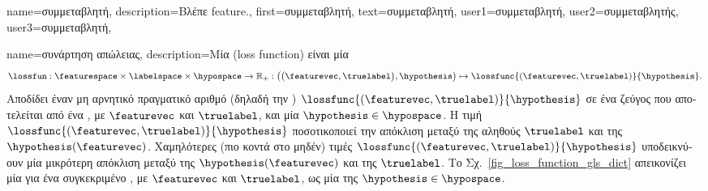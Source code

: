 {name={\foreignlanguage{greek}{συμμεταβλητή}},
	description={\foreignlanguage{greek}{Βλέπε} \gls{feature}.}, 
	first={\foreignlanguage{greek}{συμμεταβλητή}},
	text={\foreignlanguage{greek}{συμμεταβλητή}},
	user1={\foreignlanguage{greek}{συμμεταβλητή}}, %
	user2={\foreignlanguage{greek}{συμμεταβλητής}}, %
	user3={\foreignlanguage{greek}{συμμεταβλητή}}, %
}

{name={\foreignlanguage{greek}{συνάρτηση απώλειας}}, 
	description={\foreignlanguage{greek}{Μία}   
		(loss function) \foreignlanguage{greek}{είναι μία}  
		$$\lossfun: \featurespace \times \labelspace \times \hypospace \rightarrow \mathbb{R}_{+}: \big( \big(\featurevec,\truelabel\big),
		 \hypothesis\big) \mapsto  \lossfunc{(\featurevec,\truelabel)}{\hypothesis}.$$
		\foreignlanguage{greek}{Αποδίδει έναν μη αρνητικό πραγματικό αριθμό (δηλαδή την} )\linebreak 
		$\lossfunc{(\featurevec,\truelabel)}{\hypothesis}$ \foreignlanguage{greek}{σε ένα ζεύγος που αποτελείται από ένα} , 
		\foreignlanguage{greek}{με}  $\featurevec$ \foreignlanguage{greek}{και}  $\truelabel$, 
		\foreignlanguage{greek}{και μία}  $\hypothesis \in \hypospace$. \foreignlanguage{greek}{Η τιμή  
		$\lossfunc{(\featurevec,\truelabel)}{\hypothesis}$ ποσοτικοποιεί την απόκλιση μεταξύ της αληθούς}  $\truelabel$ 
		\foreignlanguage{greek}{και της}  $\hypothesis(\featurevec)$. \foreignlanguage{greek}{Χαμηλότερες (πιο κοντά 
		στο μηδέν) τιμές $\lossfunc{(\featurevec,\truelabel)}{\hypothesis}$ υποδεικνύουν μία μικρότερη απόκλιση μεταξύ της}  
		 $\hypothesis(\featurevec)$ \foreignlanguage{greek}{και της}  $\truelabel$. 
		\foreignlanguage{greek}{Το Σχ.}\ \ref{fig_loss_function_gls_dict} \foreignlanguage{greek}{απεικονίζει μία}  
		 \foreignlanguage{greek}{για ένα συγκεκριμένο} , \foreignlanguage{greek}{με} 
		 $\featurevec$ \foreignlanguage{greek}{και}  $\truelabel$, \foreignlanguage{greek}{ως μία} 
		 \foreignlanguage{greek}{της}  $\hypothesis \in \hypospace$. 
}}
